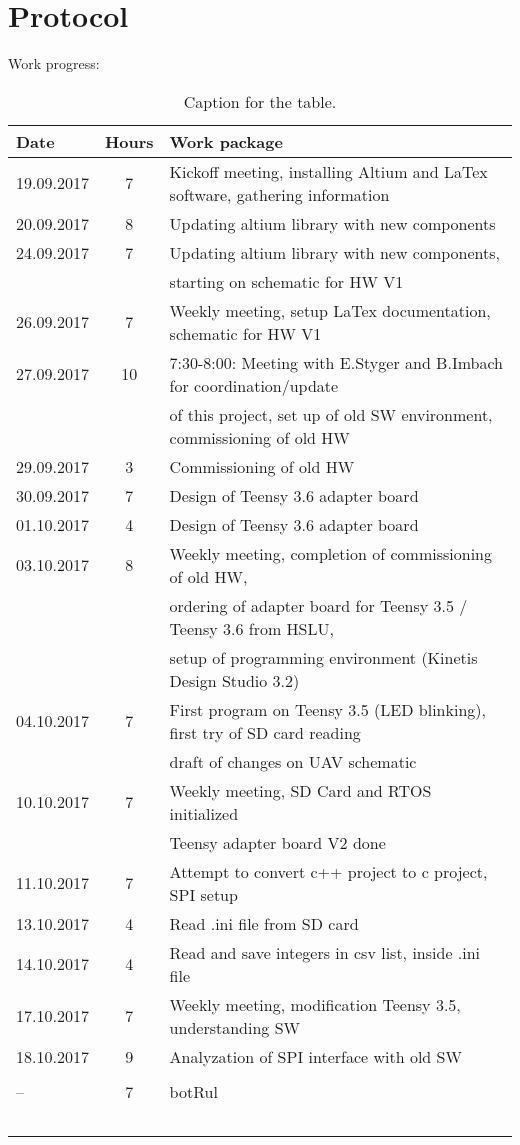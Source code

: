 \section*{Protocol}
Work progress:

\begin{table}[tp]
  \caption{Caption for the table.}
  \label{tab:table1}
  \begin{tabular}{lcl}
  \toprule%
    Date & 			Hours & 		Work package													\\\midrule
    19.09.2017 &		7 &			Kickoff meeting, installing Altium and LaTex software, gathering information 	\\
    20.09.2017 &		8 &			Updating altium library with new components 					\\
    24.09.2017 & 	7 &			Updating altium library with new components,					\\
    &				&			starting on schematic for HW V1 								\\
    26.09.2017 &		7 &			Weekly meeting, setup LaTex documentation, schematic for HW V1 	\\
    27.09.2017 &		10 &			7:30-8:00: Meeting with E.Styger and B.Imbach for coordination/update \\
    &				&			of this project, set up of old SW environment, commissioning of old HW \\
    29.09.2017 &		3 &			Commissioning of old HW 	\\
    30.09.2017 &		7 &			Design of Teensy 3.6 adapter board \\
    01.10.2017 &		4 &			Design of Teensy 3.6 adapter board \\
    03.10.2017 &		8 &			Weekly meeting, completion of commissioning of old HW, 	\\
    &				&			ordering of adapter board for Teensy 3.5 / Teensy 3.6 from HSLU,\\
    &				&			setup of programming environment (Kinetis Design Studio 3.2) \\
    04.10.2017 &		7 &			First program on Teensy 3.5 (LED blinking), first try of SD card reading \\
    &				&			draft of changes on UAV schematic \\
    10.10.2017 &		7 &			Weekly meeting, SD Card and RTOS initialized \\
    &				&			Teensy adapter board V2 done \\
    11.10.2017 &		7 &			Attempt to convert c++ project to c project, SPI setup \\
    13.10.2017 &		4 &			Read .ini file from SD card\\
    14.10.2017 &		4 &			Read and save integers in csv list, inside .ini file \\
    17.10.2017 &		7 &			Weekly meeting, modification Teensy 3.5, understanding SW\\
    18.10.2017 &		9 &			Analyzation of SPI interface with old SW\\
     																						\\\bottomrule
    -- &				7 & 			botRul \\\ 
  \end{tabular}
\end{table}
